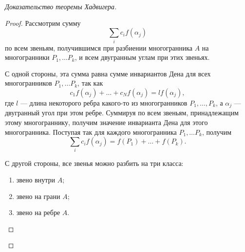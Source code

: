\begin{proof}[Доказательство теоремы Хадвигера]
\begin{proof}
    Рассмотрим сумму
    \[\sum_i c_i f(\alpha_j)\]
    по всем звеньям, получившимся при разбиении многогранника $A$ на многогранники $P_1, \dots P_k$, и всем двугранным углам при этих звеньях.

    С одной стороны, эта сумма равна сумме инвариантов Дена для всех многогранников $P_1, \dots P_k$, так как 
    \[c_1 f(\alpha_j) + \dots + c_N f(\alpha_j) = l f(\alpha_j),\]
    где $l$ — длина некоторого ребра какого-то из многогранников $P_1, \dots, P_k$, а $\alpha_j$ — двугранный угол при этом ребре. Суммируя по всем звеньям, принадлежащим этому многограннику, получим значение инварианта Дена для этого многогранника. Поступая так для каждого многогранника $P_1, \dots P_k$, получим
    \[\sum_i c_i f(\alpha_j) = f(P_1) + \dots + f(P_k).\]

    С другой стороны, все звенья можно разбить на три класса:
    \begin{enumerate}
        \item звено внутри $A$;
        \item звено на грани $A$;
        \item звено на ребре $A$.
    \end{enumerate}
    

\end{proof}
\end{proof}
